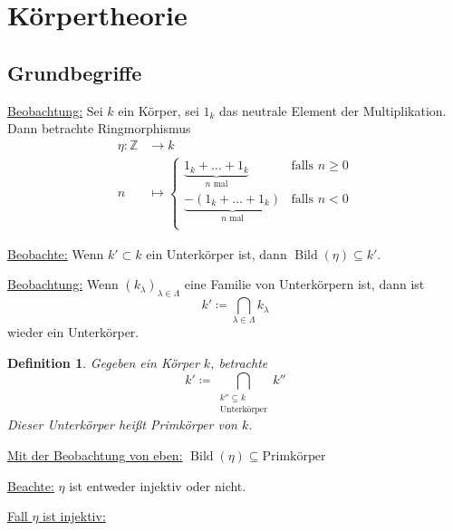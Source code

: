 \documentclass[a4paper,12pt,numbers=noenddot,parskip=full]{scrartcl}
\newcommand{\setZ}{\mathbb{Z}}
\newcommand{\setQ}{\mathbb{Q}}
\newcommand{\heading}{\underline}
\theoremstyle{dotless}
\newtheorem{definition}[theorem]{Definition}
\theoremstyle{remark}
\begin{document}
	\section{Körpertheorie}
	
	\subsection{Grundbegriffe}
	
	\heading{Beobachtung:} Sei $k$ ein Körper, sei $1_k$ das neutrale Element der Multiplikation. Dann betrachte Ringmorphismus
	\begin{align*}
		\eta: \setZ &\to k \\
		n &\mapsto \begin{cases}
			\underbrace{1_k + \dots + 1_k}_\text{$n$ mal} & \text{falls } n \geq 0 \\
			\underbrace{-(1_k + \dots + 1_k)}_\text{$n$ mal} & \text{falls } n < 0 \\
		\end{cases}
	\end{align*}
	
	\heading{Beobachte:} Wenn $k' \subset k$ ein Unterkörper ist, dann $\operatorname{Bild}(\eta) \subseteq k'$.
	
	\heading{Beobachtung:} Wenn $(k_\lambda)_{\lambda \in \Lambda}$ eine Familie von Unterkörpern ist, dann ist
	\begin{equation*}
		k' \coloneqq \bigcap_{\lambda \in \Lambda} k_\lambda
	\end{equation*}
	wieder ein Unterkörper.
	
	\begin{definition}
		Gegeben ein Körper $k$, betrachte
		\begin{equation*}
			k' \coloneqq \bigcap_{\substack{k'' \subseteq k \\ \text{Unterkörper}}} k''
		\end{equation*}
		Dieser Unterkörper heißt Primkörper von $k$.
	\end{definition}

	\heading{Mit der Beobachtung von eben:} $\operatorname{Bild}(\eta) \subseteq \text{Primkörper}$
	
	\heading{Beachte:} $\eta$ ist entweder injektiv oder nicht.
	
	\heading{Fall $\eta$ ist injektiv:}
	
	\begin{center}
	\end{center}
\end{document}
